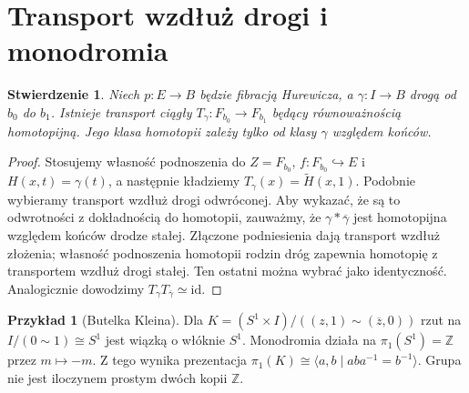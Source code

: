 \documentclass[11pt,a4paper,oneside]{report}
\newcommand{\Z}{\mathbb{Z}}
\newcommand{\id}{\mathrm{id}}
\theoremstyle{plain}
\newtheorem{stwierdzenie}[twierdzenie]{Stwierdzenie}
\theoremstyle{definition}
\newtheorem{przyklad}[twierdzenie]{Przykład}
\theoremstyle{remark}
\begin{document}
\section{Transport wzdłuż drogi i monodromia}
\begin{stwierdzenie}
Niech $p:E\to B$ będzie fibracją Hurewicza, a $\gamma:I\to B$
drogą od $b_0$ do $b_1$. Istnieje transport ciągły
$T_\gamma:F_{b_0}\to F_{b_1}$ będący równoważnością
homotopijną. Jego klasa homotopii zależy tylko od klasy
$\gamma$ względem końców.
\end{stwierdzenie}
\begin{proof}
Stosujemy własność podnoszenia do $Z=F_{b_0}$,
$f:F_{b_0}\hookrightarrow E$ i $H(x,t)=\gamma(t)$, a następnie
kładziemy $T_\gamma(x)=\widetilde H(x,1)$.
Podobnie wybieramy transport wzdłuż drogi odwróconej.
Aby wykazać, że są to odwrotności z dokładnością do homotopii,
zauważmy, że $\gamma*\overline\gamma$ jest homotopijna względem
końców drodze stałej. Złączone podniesienia dają transport wzdłuż
złożenia; własność podnoszenia homotopii rodzin dróg zapewnia
homotopię z transportem wzdłuż drogi stałej. Ten ostatni można
wybrać jako identyczność. Analogicznie dowodzimy
$T_\gamma T_{\overline\gamma}\simeq\id$.
\end{proof}

\begin{przyklad}[Butelka Kleina]
Dla $K=(S^1\times I)/((z,1)\sim(\overline z,0))$
rzut na $I/(0\sim1)\cong S^1$ jest wiązką o włóknie $S^1$.
Monodromia działa na $\pi_1(S^1)=\Z$ przez $m\mapsto-m$.
Z tego wynika prezentacja
$\pi_1(K)\cong\langle a,b\mid aba^{-1}=b^{-1}\rangle$.
Grupa nie jest iloczynem prostym dwóch kopii $\Z$.
\end{przyklad}
\end{document}
